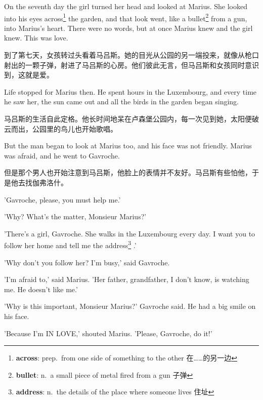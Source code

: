 \documentclass[fontset=ubuntu, zihao=5]{ctexart}
\begin{document}
\begin{paracol}{2}
\switchcolumn*

On the seventh day the girl turned her head and looked at Marius. She looked
into his eyes across\footnote{\textbf{across}: prep. from one side of
  something to the other 在……的另一边} the garden, and that look went,
like a bullet\footnote{\textbf{bullet}: n. a small piece of metal fired from
  a gun 子弹} from a gun, into Marius's heart. There were no words, but at
once Marius knew and the girl knew. This was love.

\switchcolumn

到了第七天，女孩转过头看着马吕斯。她的目光从公园的另一端投来，就像从枪口射出的一颗子弹，射进了马吕斯的心房。他们彼此无言，但马吕斯和女孩同时意识到，这就是爱。

\switchcolumn*

Life stopped for Marius then. He spent hours in the Luxembourg, and every time he saw her, the sun came out and all the birds in the garden began singing.

\switchcolumn

马吕斯的生活自此定格。他长时间地呆在卢森堡公园内，每一次见到她，太阳便破云而出，公园里的鸟儿也开始歌唱。

\switchcolumn*

But the man began to look at Marius too, and his face was not friendly. Marius was afraid, and he went to Gavroche.

\switchcolumn

但是那个男人也开始注意到马吕斯，他脸上的表情并不友好。马吕斯有些怕他，于是他去找伽弗洛什。

\switchcolumn*

'Gavroche, please, you must help me.'


'Why? What's the matter, Monsieur Marius?'


'There's a girl, Gavroche. She walks in the Luxembourg every day. I want you
to follow her home and tell me the address\footnote{\textbf{address}: n. the
  details of the place where someone lives 住址} .'


'Why don't you follow her? I'm busy,' said Gavroche.


'I'm afraid to,' said Marius. 'Her father, grandfather, I don't know, is watching me. He doesn't like me.'


'Why is this important, Monsieur Marius?' Gavroche said. He had a big smile on his face.


'Because I'm IN LOVE,' shouted Marius. 'Please, Gavroche, do it!'

\switchcolumn


\end{paracol}
\end{document}
